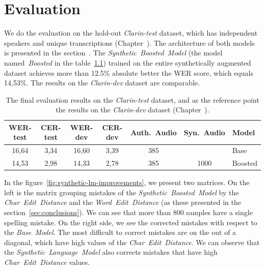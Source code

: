 
\chapter{Evaluation}\label{ch:evaluation}

We do the evaluation on the hold-out \textit{Clarin-test} dataset,
which has independent speakers and unique transcriptions (Chapter~).
The architecture of both models is presented in the section~.
The \textit{Synthetic~Boosted~Model} (the model named~\textit{Boosted} in the table~\ref{table:evaluation})
trained on the entire synthetically augmented dataset achieves more than 12.5\% absolute better the WER score, which equals 14,53\%.
The results on the \textit{Clarin-dev} dataset are comparable.

\begin{table}[h!]
\vspace*{10pt}
\centering
 \begin{tabular}{c c c c c c l}
  \toprule
    WER-test   & CER-test       &  WER-dev       & CER-dev		& Auth.~Audio	& Syn.~Audio	& Model         \\
    \midrule
    16,64       & 3,34              & 16,60	            & 3,39	        & 385		    &               & Base          \\
    14,53       & 2,98              & 14,33	            & 2,78	        & 385	        & 1000	        & Boosted       \\
  \bottomrule
 \end{tabular}
\caption{
The final evaluation results on the \textit{Clarin-test} dataset, and as the reference point
the results on the \textit{Clarin-dev} dataset (Chapter~).
}
\label{table:evaluation}
\end{table}

In the figure~\ref{fig:synthetic-lm-improvements}, we present two matrices.
On the left is the matrix grouping mistakes of the \textit{Synthetic~Boosted~Model}
by the \textit{Char~Edit~Distance} and the \textit{Word~Edit~Distance}
(as these presented in the section~\ref{sec:conclusions}).
We can see that more than 800 samples have a single spelling mistake.
On the right side, we see the corrected mistakes
with respect to the \textit{Base~Model}.
The most difficult to correct mistakes are on the out of a diagonal, which have
high values of the \textit{Char~Edit~Distance}.
We can observe that the \textit{Synthetic~Language~Model} also corrects mistakes
that have high \textit{Char~Edit~Distance} values.

